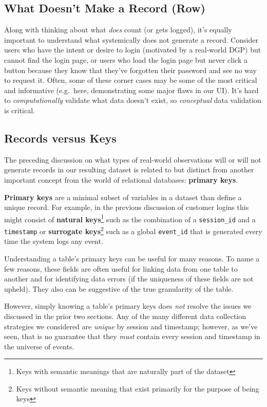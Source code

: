 \documentclass[
]{krantz}
\begin{document}
\hypertarget{what-doesnt-make-a-record-row}{%
\subsection{What Doesn't Make a Record (Row)}\label{what-doesnt-make-a-record-row}}

Along with thinking about what \emph{does} count (or gets logged), it's equally important to understand what systemically does not generate a record. Consider users who have the intent or desire to login (motivated by a real-world DGP) but cannot find the login page, or users who load the login page but never click a button because they know that they've forgotten their password and see no way to request it.
Often, some of these corner cases may be some of the most critical and informative (e.g.~here, demonstrating some major flaws in our UI).
It's hard to \emph{computationally} validate what data doesn't exist, so \emph{conceptual} data validation is critical.

\hypertarget{records-versus-keys}{%
\subsection{Records versus Keys}\label{records-versus-keys}}

The preceding discussion on what types of real-world observations will or will not generate records in our resulting dataset is related to but distinct from another important concept from the world of relational databases: \textbf{primary keys}.

\textbf{Primary keys} are a minimal subset of variables in a dataset than define a unique record.
For example, in the previous discussion of customer logins this might consist of \textbf{natural keys}\footnote{Keys with semantic meanings that are naturally part of the dataset} such as the combination of a \texttt{session\_id} and a \texttt{timestamp} or \textbf{surrogate keys}\footnote{Keys without semantic meaning that exist primarily for the purpose of being keys} such as a global \texttt{event\_id} that is generated every time the system logs any event.

Understanding a table's primary keys can be useful for many reasons.
To name a few reasons, these fields are often useful for linking data from one table to another and for identifying data errors (if the uniqueness of these fields are not upheld).
They also can be suggestive of the true granularity of the table.

However, simply knowing a table's primary keys does \emph{not} resolve the issues we discussed in the prior two sections.
Any of the many different data collection strategies we considered are \emph{unique} by session and timestamp;
however, as we've seen, that is no guarantee that they \emph{must} contain every session and timestamp in the universe of events.
\end{document}
